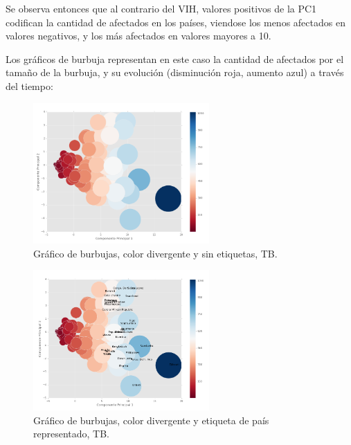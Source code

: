 \documentclass[letter, 10pt]{article}
\begin{document}
Se observa entonces que al contrario del VIH, valores positivos de la PC1 codifican la cantidad de afectados en los países, viendose los menos afectados en valores negativos, y los más afectados en valores mayores a 10.

Los gráficos de burbuja representan en este caso la cantidad de afectados por el tamaño de la burbuja, y su evolución (disminución roja, aumento azul) a través del tiempo:

\begin{figure}[H]
\begin{center}
\includegraphics[width=0.6\textwidth]{Images/2-4burb.png}
\caption{Gráfico de burbujas, color divergente y sin etiquetas, TB.}
\end{center}
\end{figure}

\begin{figure}[H]
\begin{center}
\includegraphics[width=0.6\textwidth]{Images/2-5burb.png}
\caption{Gráfico de burbujas, color divergente y etiqueta de país representado, TB.}
\end{center}
\end{figure}



\end{document}
